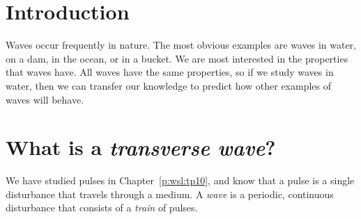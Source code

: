 \section{Introduction}
Waves occur frequently in nature. The most obvious examples are
waves in water, on a dam, in the ocean, or in a bucket. We are
most interested in the properties that waves have. All waves have
the same properties, so if we study waves in water, then we can transfer
our knowledge to predict how other examples of waves will behave.

\section{What is a \textit{transverse wave}?}

We have studied pulses in Chapter~\ref{p:wsl:tp10}, and know that a pulse is a single disturbance that travels through a medium. A \textit{wave} is a periodic, continuous disturbance that consists of a \textit{train} of pulses. 


